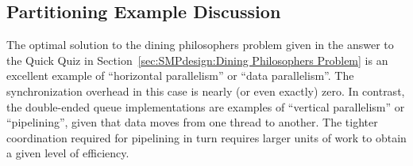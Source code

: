\fi

\subsection{Partitioning Example Discussion}
\label{sec:SMPdesign:Partitioning Example Discussion}

The optimal solution to the dining philosophers problem given in
the answer to the Quick Quiz in
Section~\ref{sec:SMPdesign:Dining Philosophers Problem}
is an excellent example of ``horizontal parallelism'' or
``data parallelism''.
The synchronization overhead in this case is nearly (or even exactly)
zero.
In contrast, the double-ended
queue implementations are examples of ``vertical parallelism'' or
``pipelining'', given that data moves from one thread to another.
The tighter coordination required for pipelining in turn requires
larger units of work to obtain a given level of efficiency.

